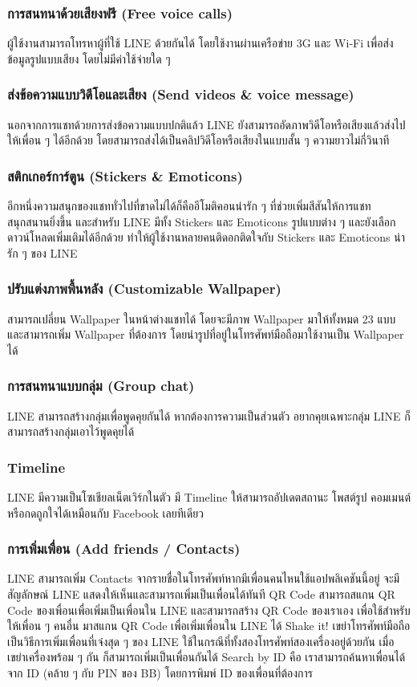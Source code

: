 \subsubsection{การสนทนาด้วยเสียงฟรี (Free voice calls)} 
\quad ผู้ใช้งานสามารถโทรหาผู้ที่ใช้ LINE ด้วยกันได้ โดยใช้งานผ่านเครือข่าย 3G และ Wi-Fi เพื่อส่งข้อมูลรูปแบบเสียง โดยไม่มีค่าใช้จ่ายใด ๆ  
\subsubsection{ส่งข้อความแบบวิดีโอและเสียง (Send videos \& voice message)} 
\quad นอกจากการแชทด้วยการส่งข้อความแบบปกติแล้ว LINE ยังสามารถอัดภาพวิดีโอหรือเสียงแล้วส่งไปให้เพื่อน ๆ ได้อีกด้วย โดยสามารถส่งได้เป็นคลิปวิดีโอหรือเสียงในแบบสั้น ๆ ความยาวไม่กี่วินาที   
\subsubsection{สติกเกอร์การ์ตูน (Stickers \& Emoticons)}
\quad อีกหนึ่งความสนุกของแชททั่วไปที่ขาดไม่ได้ก็คืออีโมติคอนน่ารัก ๆ ที่ช่วยเพิ่มสีสันให้การแชทสนุกสนานยิ่งขึ้น และสำหรับ LINE มีทั้ง Stickers และ Emoticons รูปแบบต่าง ๆ และยังเลือกดาวน์โหลดเพิ่มเติมได้อีกด้วย ทำให้ผู้ใช้งานหลายคนติดอกติดใจกับ Stickers และ Emoticons น่ารัก ๆ ของ LINE  
\subsubsection{ปรับแต่งภาพพื้นหลัง (Customizable Wallpaper)}
\quad สามารถเปลี่ยน Wallpaper ในหน้าต่างแชทได้ โดยจะมีภาพ Wallpaper มาให้ทั้งหมด 23 แบบ และสามารถเพิ่ม Wallpaper ที่ต้องการ โดยนำรูปที่อยู่ในโทรศัพท์มือถือมาใช้งานเป็น Wallpaper ได้  
\subsubsection{การสนทนาแบบกลุ่ม (Group chat)} 
\quad LINE สามารถสร้างกลุ่มเพื่อพูดคุยกันได้ หากต้องการความเป็นส่วนตัว อยากคุยเฉพาะกลุ่ม LINE ก็สามารถสร้างกลุ่มเอาไว้พูดคุยได้ 
\subsubsection{Timeline} 
\quad LINE มีความเป็นโซเชียลเน็ตเวิร์กในตัว มี Timeline ให้สามารถอัปเดตสถานะ โพสต์รูป คอมเมนต์ หรือกดถูกใจได้เหมือนกับ Facebook เลยทีเดียว 
\subsubsection{การเพิ่มเพื่อน (Add friends / Contacts)}
\quad LINE สามารถเพิ่ม Contacts จากรายชื่อในโทรศัพท์หากมีเพื่อนคนไหนใช้แอปพลิเคชันนี้อยู่ จะมีสัญลักษณ์ LINE แสดงให้เห็นและสามารถเพิ่มเป็นเพื่อนได้ทันที QR Code สามารถสแกน QR Code ของเพื่อนเพื่อเพิ่มเป็นเพื่อนใน LINE และสามารถสร้าง QR Code ของเราเอง เพื่อใช้สำหรับให้เพื่อน ๆ คนอื่น มาสแกน QR Code เพื่อเพิ่มเพื่อนใน LINE ได้ Shake it! เขย่าโทรศัพท์มือถือ เป็นวิธีการเพิ่มเพื่อนที่เจ๋งสุด ๆ ของ LINE ใช้ในกรณีที่ทั้งสองโทรศัพท์สองเครื่องอยู่ด้วยกัน เมื่อเขย่าเครื่องพร้อม ๆ กัน ก็สามารถเพิ่มเป็นเพื่อนกันได้ Search by ID คือ เราสามารถค้นหาเพื่อนได้จาก ID (คล้าย ๆ กับ PIN ของ BB) โดยการพิมพ์ ID ของเพื่อนที่ต้องการ 

